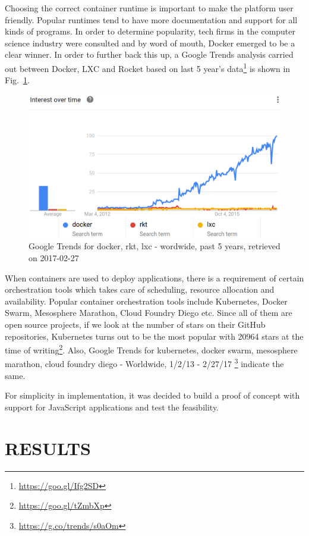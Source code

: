 \documentclass[DD]{iitmdiss}
\begin{document}
Choosing the correct container runtime is important to make the platform user friendly. Popular runtimes tend to have more documentation and support for all kinds of programs. In order to determine popularity, tech firms in the computer science industry were consulted and by word of mouth, Docker emerged to be a clear winner. In order to further back this up, a Google Trends analysis carried out between Docker, LXC and Rocket based on last 5 year's data\footnote{\url{https://goo.gl/Ifg2SD}} is shown in Fig.~\ref{fig:google_trends_docker_rkt_lxc}. 

\begin{figure}
\centering
\includegraphics[width=0.9\linewidth]{img/google_trends_docker_rkt_lxc}
\caption[Google Trends for docker, rkt, lxc]{Google Trends for docker, rkt, lxc - wordwide, past 5 years, retrieved on 2017-02-27}
\label{fig:google_trends_docker_rkt_lxc}
\end{figure}

When containers are used to deploy applications, there is a requirement of certain orchestration tools which takes care of scheduling, resource allocation and availability. Popular container orchestration tools include Kubernetes, Docker Swarm, Mesosphere Marathon, Cloud Foundry Diego etc. Since all of them are open source projects, if we look at the number of stars on their GitHub repositories, Kubernetes turns out to be the most popular with 20964 stars at the time of writing\footnote{\url{https://goo.gl/tZmbXp}}. Also, Google Trends for kubernetes, docker swarm, mesosphere marathon, cloud foundry diego - Worldwide, 1/2/13 - 2/27/17 \footnote{\url{https://g.co/trends/s0aOm}} indicate the same.

For simplicity in implementation, it was decided to build a proof of concept with support for JavaScript applications and test the feasibility. 
\chapter{RESULTS}
\end{document}
